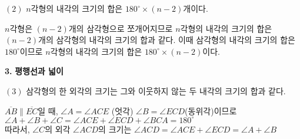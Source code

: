 \documentclass{oblivoir}
\begin{document}
\begin{flushleft}
    $(2)$ $n$각형의 내각의 크기의 합은 $180^{\circ} \times (n-2)$개이다.
\end{flushleft}

\begin{tcolorbox}[colback = skyblue!5!white, colframe = skyblue!99!black, title = \textmd{이해하기}]
    $n$각형은 $(n-2)$개의 삼각형으로 쪼개어지므로 $n$각형의 내각의 크기의 합은
    $(n-2)$개의 삼각형의 내각의 크기의 합과 같다. 이때 삼각형의 내각의 크기의 합은
    $180^{\circ}$이므로 $n$각형의 내각의 크기의 합은 $180^{\circ} \times (n-2)$이다.
\end{tcolorbox} 


\begin{flushleft}
    {\setmainfont{KoPubWorld돋움체_Pro Medium}\textcolor{skyblue2}{{\huge\textbf{3.}}}}
    {\textcolor{skyblue2}{{\huge\textbf{평행선과 넓이}}}}

\end{flushleft}





\begin{flushleft}
    $(3)$ 삼각형의 한 외각의 크기는 그와 이웃하지 않는 두 내각의 크기의 합과 같다.
\end{flushleft}

\begin{tcolorbox}[colback = skyblue!5!white, colframe = skyblue!99!black, title = \textmd{이해하기}]
    $\overline{AB} \parallel \overline{EC}$일 때, $\angle A = \angle ACE$ (엇각) $\angle B = \angle ECD$(동위각)이므로\\ 
    $\angle A + \angle B + \angle C = \angle ACE + \angle ECD + \angle BCA = 180^{\circ}$ \\
    따라서, $\angle C$의 외각 $\angle ACD$의 크기는 $\angle ACD = \angle ACE + \angle ECD = \angle A + \angle B$
\end{tcolorbox}
\end{document}

